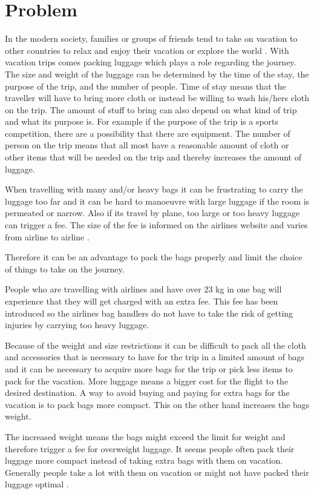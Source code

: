 \section{Problem}
In the modern society, families or groups of friends tend to take on vacation to other countries to relax and enjoy their vacation or explore the world \citep{danskecharter}.
With vacation trips comes packing luggage which plays a role regarding the journey. The size and weight of the luggage can be determined by the time of the stay, the purpose of the trip, and the number of people.
Time of stay means that the traveller will have to bring more cloth or instead be willing to wash his/hers cloth on the trip.
The amount of stuff to bring can also depend on what kind of trip and what its purpose is. For example if the purpose of the trip is a sports competition, there are a possibility that there are equipment.
The number of person on the trip means that all most have a reasonable amount of cloth or other items that will be needed on the trip and thereby increases the amount of luggage.

When travelling with many and/or heavy bags it can be frustrating to carry the luggage too far and it can be hard to manoeuvre with large luggage if the room is permeated or narrow. Also if its travel by plane, too large or too heavy luggage can trigger a fee. The size of the fee is informed on the airlines website and varies from airline to airline \citep{altombag}.

Therefore it can be an advantage to pack the bags properly and limit the choice of things to take on the journey.

People who are travelling with airlines and have over 23 kg in one bag will experience that they will get charged with an extra fee. This fee has been introduced so the airlines bag handlers do not have to take the risk of getting injuries by carrying too heavy luggage.

Because of the weight and size restrictions it can be difficult to pack all the cloth and accessories that is necessary to have for the trip in a limited amount of bags and it can be necessary to acquire more bags for the trip or pick less items to pack for the vacation. More luggage means a bigger cost for the flight to the desired destination. A way to avoid buying and paying for extra bags for the vacation is to pack bags more compact. This on the other hand increases the bags weight\citep{altombag}.

The increased weight means the bags might exceed the limit for weight and therefore trigger a fee for overweight luggage.
It seems people often pack their luggage more compact instead of taking extra bags with them on vacation. Generally people take a lot with them on vacation or might not have packed their luggage optimal \citep{airstat}.

